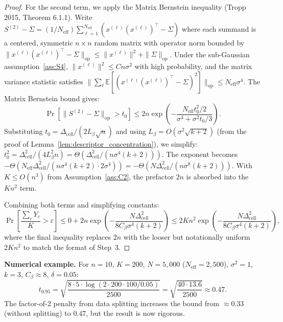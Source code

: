 \documentclass{article}
\theoremstyle{definition}
\theoremstyle{plain}
\theoremstyle{remark}
\begin{document}
\begin{proof}
For the second term, we apply the Matrix Bernstein inequality (Tropp 2015, Theorem 6.1.1).
Write $S^{(2)} - \Sigma = (1/N_{\mathrm{eff}})\sum_{\ell=1}^{N_{\mathrm{eff}}}
(x^{(\ell)}(x^{(\ell)})^\top - \Sigma)$ where each summand is a centered, symmetric
$n \times n$ random matrix with operator norm bounded by $\|x^{(\ell)}(x^{(\ell)})^\top -
\Sigma\|_{\mathrm{op}} \leq \|x^{(\ell)}\|^2 + \|\Sigma\|_{\mathrm{op}}$. Under the
sub-Gaussian assumption~\ref{ass:S4}, $\|x^{(\ell)}\|^2 \leq C n \sigma^2$ with high
probability, and the matrix variance statistic satisfies
$\|\sum_\ell \mathbb{E}[(x^{(\ell)}(x^{(\ell)})^\top - \Sigma)^2]\|_{\mathrm{op}}
\leq N_{\mathrm{eff}} \sigma^4$. The Matrix Bernstein bound gives:
\begin{equation}
  \Pr[\|S^{(2)} - \Sigma\|_{\mathrm{op}} > t_0]
  \leq 2n \exp\!\left(-\frac{N_{\mathrm{eff}} t_0^2/2}{\sigma^4 + \sigma^2 t_0/3}\right).
\end{equation}
Substituting $t_0 = \Delta_{\mathrm{cell}}/(2L_\beta\sqrt{n})$ and using
$L_\beta = O(\sigma^2 \sqrt{k+2})$ (from the proof of Lemma~\ref{lem:descriptor_concentration}),
we simplify: $t_0^2 = \Delta_{\mathrm{cell}}^2/(4L_\beta^2 n)
= \Theta(\Delta_{\mathrm{cell}}^2/(n\sigma^4(k+2)))$. The exponent becomes
$-\Theta(N_{\mathrm{eff}} \Delta_{\mathrm{cell}}^2 / (n \sigma^4(k+2) \cdot 2\sigma^4))
= -\Theta(N \Delta_{\mathrm{cell}}^2/(n\sigma^8(k+2)))$. With $K \leq O(n^3)$ from
Assumption~\ref{ass:C2}, the prefactor $2n$ is absorbed into the $Kn^2$ term.

Combining both terms and simplifying constants:
\begin{equation}
  \Pr\!\left[\frac{\sum_c Y_c}{K} > \varepsilon\right]
  \leq 0 + 2n\exp\!\left(-\frac{N\Delta_{\mathrm{cell}}^2}
  {8C_\beta\sigma^4(k+2)}\right)
  \leq 2Kn^2\exp\!\left(-\frac{N\Delta_{\mathrm{cell}}^2}
  {8C_\beta\sigma^4(k+2)}\right),
\end{equation}
where the final inequality replaces $2n$ with the looser but notationally uniform $2Kn^2$
to match the format of Step~3.
\end{proof}

\textbf{Numerical example.} For $n = 10$, $K = 200$, $N = 5{,}000$
($N_{\mathrm{eff}} = 2{,}500$), $\sigma^2 = 1$, $k = 3$, $C_\beta \approx 8$,
$\delta = 0.05$:
\begin{equation}
  t_{0.95} = \sqrt{\frac{8 \cdot 5 \cdot \log(2 \cdot 200 \cdot 100 / 0.05)}{2500}}
  = \sqrt{\frac{40 \cdot 13.6}{2500}} \approx 0.47.
\end{equation}
The factor-of-2 penalty from data splitting increases the bound from $\approx 0.33$
(without splitting) to $0.47$, but the result is now rigorous.
\end{document}
